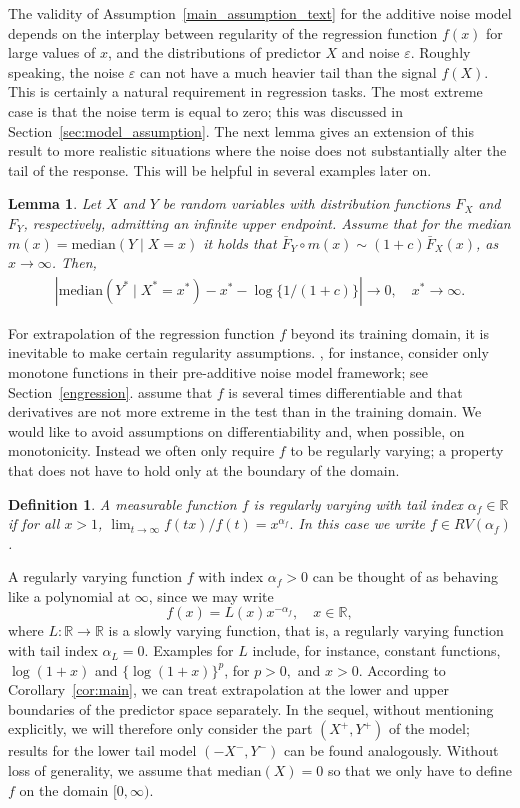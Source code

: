 \documentclass{statsoc}
\newtheorem{lemma}{Lemma}
\newtheorem{definition}{Definition}
\theoremstyle{break}
\newcommand{\eps}{\varepsilon}
\def\M{\text{median}}
\newcommand{\beao}{\begin{eqnarray*}}
\newcommand{\eeao}{\end{eqnarray*}\noindent}
\begin{document}
The validity of Assumption~\eqref{main_assumption_text} for the additive noise model depends on the interplay between regularity of the regression function $f(x)$ for large values of $x$,
 and the distributions of predictor $X$ and noise $\eps$. Roughly speaking, 
 the noise $\eps$ can not have a much heavier tail than the signal $f(X)$.
  This is certainly a natural requirement  in regression tasks. 
  The most extreme case is that the noise term is equal to zero; this was discussed in Section~\ref{sec:model_assumption}.
   The next lemma gives an extension of this result to more realistic situations where the noise does not substantially alter the tail of the response. This will be helpful in several examples later on.
\begin{lemma}\label{lem:median:equation}
	Let $X$ and $Y$ be random variables with distribution functions $F_X$ and $F_Y$, respectively, admitting an infinite upper endpoint. Assume that for the median $m(x) = \M( Y \mid X = x)$ it holds that $ \bar F_Y \circ m(x) \sim (1+c) \bar F_X(x) $, as $x \to \infty$.  Then,
	\beao 
	|\M( Y^* \mid X^* = x^*) - x^* - \log\{1/(1+c)\}| \to 0, \quad x^* \to \infty.
	\eeao 
\end{lemma}

For extrapolation of the regression function $f$ beyond its training domain, it is inevitable to make certain regularity assumptions. \cite{shen:meinshausen:2023}, for instance, consider only monotone functions in their pre-additive noise model framework; see Section~\ref{engression}. \cite{pfister:buhlman:2023} assume that $f$ is several times differentiable and that derivatives are not more extreme in the test than in the training domain. We would like to avoid assumptions on differentiability and, when possible, on monotonicity. Instead we often only require $f$ to be regularly varying; a property that does not have to hold only at the boundary of the domain.
\begin{definition}
	A  measurable function $f$ is regularly varying with tail index $\alpha_f \in \mathbb{R}$ if for all $x > 1$, $\lim_{t \to \infty} f(tx)/f(t) = x^{\alpha_f}.$ In this case we write $f \in RV(\alpha_f)$.
\end{definition}

A regularly varying function $f$ with index $\alpha_f > 0$ can be thought of as behaving like a polynomial at $\infty$, since we may write
\[ f(x) = L(x) x^{-\alpha_f}, \quad x\in \mathbb R,\]
where $L:\mathbb R\to\mathbb R$ is a slowly varying function, 
that is, a regularly varying function with tail index $\alpha_L=0$.
Examples for $L$ include, for instance, constant functions, $\log(1+x)$ and $\{\log(1+x)\}^p$, for $p >0,$ and $x >0$. 
According to Corollary~\ref{cor:main}, we can treat extrapolation at the lower and upper
 boundaries of the predictor space separately. In the sequel, 
 without mentioning explicitly, 
 we will therefore only consider the part $(X^+, Y^+)$ of the model; 
 results for the lower tail model $(-X^-, Y^-)$ can be found analogously. 
 Without loss of generality, we assume that $\M(X) = 0$
 so that we only have to define $f$ on the domain $[0,\infty)$.
\end{document}
